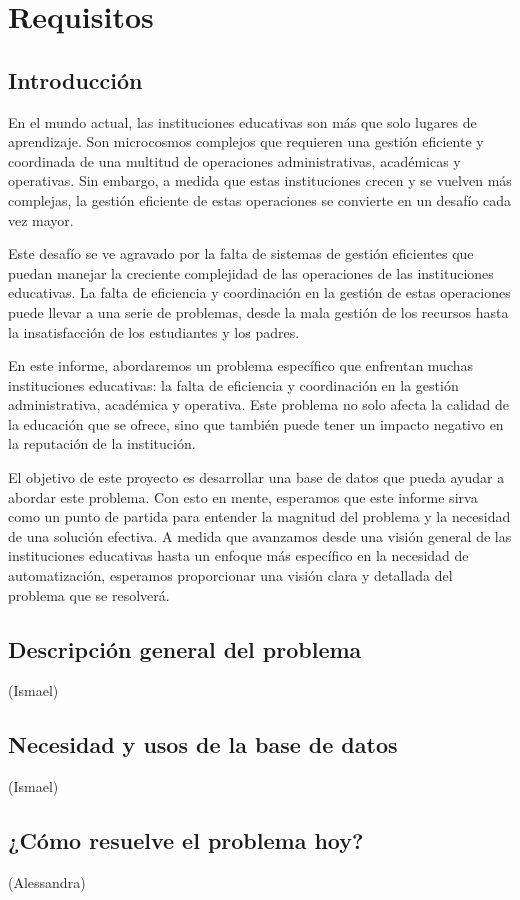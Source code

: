 \section{Requisitos}
\subsection{Introducción}
En el mundo actual, las instituciones educativas son más que solo lugares de aprendizaje. Son microcosmos complejos que requieren una gestión eficiente y coordinada de una multitud de operaciones administrativas, académicas y operativas. Sin embargo, a medida que estas instituciones crecen y se vuelven más complejas, la gestión eficiente de estas operaciones se convierte en un desafío cada vez mayor.

Este desafío se ve agravado por la falta de sistemas de gestión eficientes que puedan manejar la creciente complejidad de las operaciones de las instituciones educativas. La falta de eficiencia y coordinación en la gestión de estas operaciones puede llevar a una serie de problemas, desde la mala gestión de los recursos hasta la insatisfacción de los estudiantes y los padres.

En este informe, abordaremos un problema específico que enfrentan muchas instituciones educativas: la falta de eficiencia y coordinación en la gestión administrativa, académica y operativa. Este problema no solo afecta la calidad de la educación que se ofrece, sino que también puede tener un impacto negativo en la reputación de la institución.

El objetivo de este proyecto es desarrollar una base de datos que pueda ayudar a abordar este problema. Con esto en mente, esperamos que este informe sirva como un punto de partida para entender la magnitud del problema y la necesidad de una solución efectiva. A medida que avanzamos desde una visión general de las instituciones educativas hasta un enfoque más específico en la necesidad de automatización, esperamos proporcionar una visión clara y detallada del problema que se resolverá.
\subsection{Descripción general del problema} (Ismael)
\subsection{Necesidad y usos de la base de datos} (Ismael)
\subsection{¿Cómo resuelve el problema hoy?} (Alessandra)
